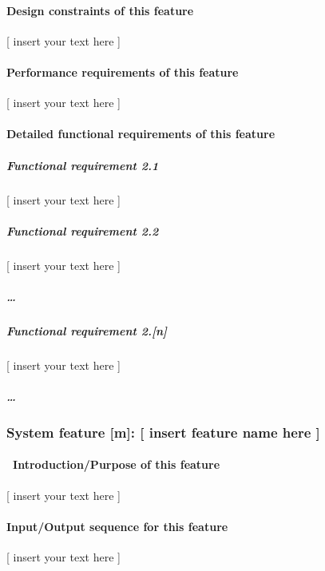 \documentclass[twoside,letterpaper]{article}
\begin{document}
\paragraph[Design constraints of this
feature]{\rmfamily\bfseries\color{black} Design
constraints of this feature}
{\color{black}
[ insert your text here ]}

\paragraph[Performance requirements of this
feature]{\rmfamily\bfseries\color{black}
Performance requirements of this feature}
{\color{black}
[ insert your text here ]}

\paragraph[Detailed functional requirements of this
feature]{\rmfamily\bfseries\color{black}
Detailed functional requirements of this feature}
\subparagraph{Functional requirement 2.1}
{\color{black}
[ insert your text here ]}

\subparagraph{Functional requirement 2.2}
{\color{black}
[ insert your text here ]}

\subparagraph{{\dots}}
\subparagraph{Functional requirement 2.[n]}
{\color{black}
[ insert your text here ]}

\subparagraph{{\dots}}
\subsubsection[System feature [m{]}: [ insert feature name here
{]}]{\rmfamily\bfseries\color{black} System
feature [m]: [ insert feature name here ]}
\paragraph[\ Introduction/Purpose of this
feature]{\foreignlanguage{english}{\ }\foreignlanguage{english}{Introduction/Purpose
of this feature}}
{\color{black}
[ insert your text here ]}

\paragraph[Input/Output sequence for this
feature]{\rmfamily\bfseries\color{black}
Input/Output sequence for this feature}
{\color{black}
[ insert your text here ]}
\end{document}
